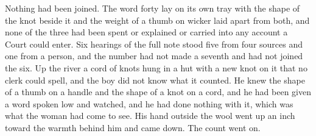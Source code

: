 Nothing had been joined. The word forty lay on its own tray with the shape of the knot beside it and the weight of a thumb on wicker laid apart from both, and none of the three had been spent or explained or carried into any account a Court could enter. Six hearings of the full note stood five from four sources and one from a person, and the number had not made a seventh and had not joined the six. Up the river a cord of knots hung in a hut with a new knot on it that no clerk could spell, and the boy did not know what it counted. He knew the shape of a thumb on a handle and the shape of a knot on a cord, and he had been given a word spoken low and watched, and he had done nothing with it, which was what the woman had come to see. His hand outside the wool went up an inch toward the warmth behind him and came down. The count went on.
